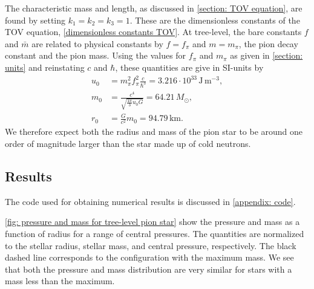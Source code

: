 The characteristic mass and length, as discussed in \autoref{section: TOV equation}, are found by setting $k_1 = k_2 = k_3 = 1$.
These are the dimensionless constants of the TOV equation, \autoref{dimensionless constants TOV}.
At tree-level, the bare constants $f$ and $\bar m$ are related to physical constants by $f = f_\pi$ and $m = m_\pi$, the pion decay constant and the pion mass.
Using the values for $f_\pi$ and $m_\pi$ as given in \autoref{section: units} and reinstating $c$ and $\hbar$, these quantities are give in SI-units by
%
\begin{align}
    u_0 & =m_\pi^2 f_\pi^2 \frac{c}{\hbar^3}
    = 3.216\cdot 10^{33} \, \text{J}\,\text{m}^{-3}, \\
    m_0 & = \frac{c^4}{\sqrt{\frac{4 \pi}{ 3} u_0 G}} = 64.21\, M_\odot, \\
    r_0 & = \frac{G}{c^2} m_0 = 94.79 \, \text{km}.
\end{align}
%
We therefore expect both the radius and mass of the pion star to be around one order of magnitude larger than the star made up of cold neutrons.


\subsection{Results}

The code used for obtaining numerical results is discussed in \autoref{appendix: code}.

\autoref{fig: pressure and mass for tree-level pion star} show the pressure and mass as a function of radius for a range of central pressures.
The quantities are normalized to the stellar radius, stellar mass, and central pressure, respectively.
The black dashed line corresponds to the configuration with the maximum mass.
We see that both the pressure and mass distribution are very similar for stars with a mass less than the maximum.

